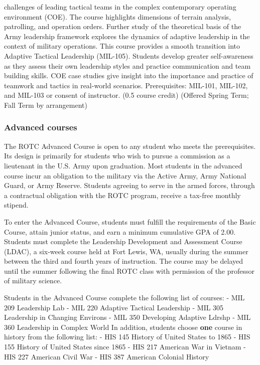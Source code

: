 \documentclass[
  letterpaper,
]{scrbook}
\begin{document}
\begin{itemize}
  challenges of leading tactical teams in the complex contemporary
  operating environment (COE). The course highlights dimensions of
  terrain analysis, patrolling, and operation orders. Further study of
  the theoretical basis of the Army leadership framework explores the
  dynamics of adaptive leadership in the context of military operations.
  This course provides a smooth transition into Adaptive Tactical
  Leadership (MIL-105). Students develop greater self-awareness as they
  assess their own leadership styles and practice communication and team
  building skills. COE case studies give insight into the importance and
  practice of teamwork and tactics in real-world scenarios.
  Prerequisites: MIL-101, MIL-102, and MIL-103 or consent of instructor.
  (0.5 course credit) (Offered Spring Term; Fall Term by arrangement)
\end{itemize}

\hypertarget{advanced-courses}{%
\subsubsection*{Advanced courses}\label{advanced-courses}}

The ROTC Advanced Course is open to any student who meets the
prerequisites. Its design is primarily for students who wish to pursue a
commission as a lieutenant in the U.S. Army upon graduation. Most
students in the advanced course incur an obligation to the military via
the Active Army, Army National Guard, or Army Reserve. Students agreeing
to serve in the armed forces, through a contractual obligation with the
ROTC program, receive a tax-free monthly stipend.

To enter the Advanced Course, students must fulfill the requirements of
the Basic Course, attain junior status, and earn a minimum cumulative
GPA of 2.00. Students must complete the Leadership Development and
Assessment Course (LDAC), a six-week course held at Fort Lewis, WA,
usually during the summer between the third and fourth years of
instruction. The course may be delayed until the summer following the
final ROTC class with permission of the professor of military science.

Students in the Advanced Course complete the following list of courses:
- MIL 209 Leadership Lab - MIL 220 Adaptive Tactical Leadership - MIL
305 Leadership in Changing Environs - MIL 350 Developing Adaptive Ldrshp
- MIL 360 Leadership in Complex World In addition, students choose
\textbf{one} course in history from the following list: - HIS 145
History of United States to 1865 - HIS 155 History of United States
since 1865 - HIS 217 American War in Vietnam - HIS 227 American Civil
War - HIS 387 American Colonial History
\end{document}

